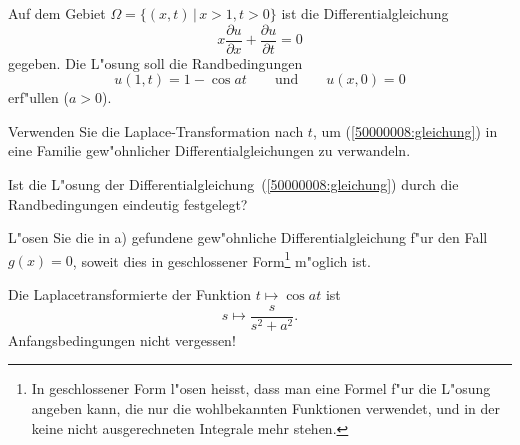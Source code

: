 Auf dem Gebiet $\Omega=\{(x,t)\,|\, x>1,t > 0\}$
ist die Differentialgleichung
\begin{equation}
x\frac{\partial u}{\partial x}+\frac{\partial u}{\partial t}=0
\label{50000008:gleichung}
\end{equation}
gegeben. Die L"osung soll die Randbedingungen
\[
u(1,t)=1-\cos at
\qquad
\text{und}
\qquad
u(x,0)=0
\]
erf"ullen ($a > 0$).
\begin{teilaufgaben}
\item Verwenden Sie die Laplace-Transformation nach $t$,
um (\ref{50000008:gleichung}) in eine Familie gew"ohnlicher
Differentialgleichungen zu verwandeln.
\item 
Ist die L"osung der Differentialgleichung~(\ref{50000008:gleichung}) durch
die Randbedingungen eindeutig festgelegt?
\item
L"osen Sie die in a) gefundene gew"ohnliche Differentialgleichung f"ur den Fall
$g(x)=0$, soweit dies in geschlossener Form\footnote{In geschlossener Form
l"osen heisst, dass man eine Formel f"ur die L"osung angeben kann, die 
nur die wohlbekannten Funktionen verwendet, und in der keine nicht
ausgerechneten Integrale mehr stehen.
} m"oglich ist.
\end{teilaufgaben}

\begin{hinweis}
Die Laplacetransformierte der Funktion $t\mapsto\cos at$ ist
\[
s\mapsto
\frac{s}{s^2+a^2}.
\]
Anfangsbedingungen nicht vergessen!
\end{hinweis}

